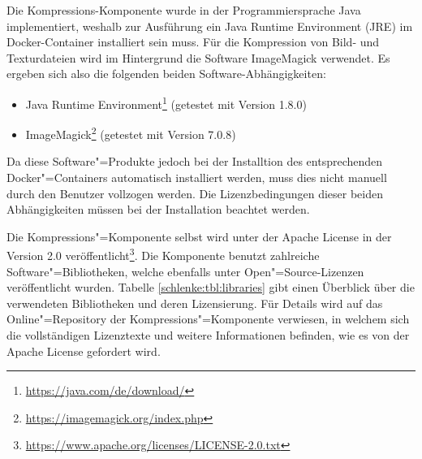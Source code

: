 Die Kompressions-Komponente wurde in der Programmiersprache Java implementiert, weshalb zur Ausführung ein Java Runtime Environment (JRE) im Docker-Container installiert sein muss. Für die Kompression von Bild- und Texturdateien wird im Hintergrund die Software ImageMagick verwendet. Es ergeben sich also die folgenden beiden Software-Abhängigkeiten:
\begin{itemize}
\item Java Runtime Environment\footnote{\url{https://java.com/de/download/}} (getestet mit Version 1.8.0)
\item ImageMagick\footnote{\url{https://imagemagick.org/index.php}} (getestet mit Version 7.0.8)
\end{itemize}
Da diese Software"=Produkte jedoch bei der Installtion des entsprechenden Docker"=Containers automatisch installiert werden, muss dies nicht manuell durch den Benutzer vollzogen werden. Die Lizenzbedingungen dieser beiden Abhängigkeiten müssen bei der Installation beachtet werden.

Die Kompressions"=Komponente selbst wird unter der Apache License in der Version 2.0 veröffentlicht\footnote{\url{https://www.apache.org/licenses/LICENSE-2.0.txt}}. Die Komponente benutzt zahlreiche Software"=Bibliotheken, welche ebenfalls unter Open"=Source-Lizenzen veröffentlicht wurden. Tabelle \ref{schlenke:tbl:libraries} gibt einen Überblick über die verwendeten Bibliotheken und deren Lizensierung. Für Details wird auf das Online"=Repository der Kompressions"=Komponente verwiesen, in welchem sich die vollständigen Lizenztexte und weitere Informationen befinden, wie es von der Apache License gefordert wird.

